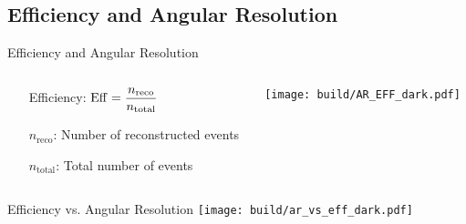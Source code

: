\subsection{Efficiency and Angular Resolution}%
\label{sub:Efficiency_AR}

\begin{frame}{Efficiency and Angular Resolution}
    \begin{columns}
        \begin{column}{0.28\textwidth}
            \begin{itemize}\setlength\itemsep{2em}
                \item [\rightarrow] Efficiency: \hspace{0.5cm} \(\displaystyle \operatorname{Eff} = \frac{n_\text{reco}}{n_\text{total}}\)
                \item [\textcolor{white!70!black}{\(n_\text{reco}\):}] Number of reconstructed events
                \item [\textcolor{white!70!black}{\(n_\text{total}\):}] Total number of events
            \end{itemize}
        \end{column}
        \begin{column}{0.68\textwidth}
            \centering
            \texttt{[image: build/AR\_EFF\_dark.pdf]}
        \end{column}
    \end{columns}

\end{frame}

\begin{frame}{Efficiency vs. Angular Resolution}
    \centering
    \texttt{[image: build/ar\_vs\_eff\_dark.pdf]}
\end{frame}

